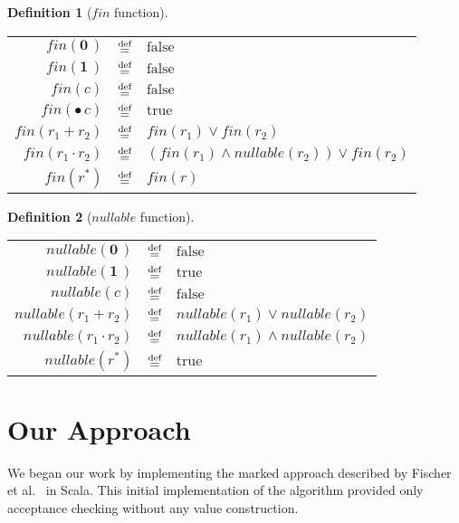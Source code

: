 \documentclass[12pt]{article}
\newtheorem{definition}{Definition} %
\newcommand{\dn}{\ensuremath{\stackrel{\mbox{\scriptsize def}}{=}}}
\newcommand{\ZERO}{\textbf{0}}
\newcommand{\ONE}{\textbf{1}}
\newcommand{\Marked}[1]{\bullet\,#1}
\newcommand{\fin}{\textit{fin}}
\newcommand{\nullable}{\textit{nullable}}
\begin{document}
\begin{definition}[$\fin$ function]\mbox{}
\begin{center}{
  \renewcommand{\arraystretch}{1.7}
  \begin{tabular}{rcl}
    $\fin(\ZERO\,)$            & \dn & $\text{false}$ \\
    $\fin(\ONE\,)$             & \dn & $\text{false}$ \\
    $\fin(c)$                  & \dn & $\text{false}$ \\
    $\fin(\Marked{c})$         & \dn & $\text{true}$ \\
    $\fin(r_1 + r_2)$          & \dn & $\fin(r_1) \lor \fin(r_2)$ \\ 
    $\fin(r_1 \cdot r_2)$      & \dn & $(\fin(r_1) \land \nullable(r_2)) \lor \fin(r_2)$ \\
    $\fin(r^*)$                & \dn & $\fin(r)$  
  \end{tabular}
  \renewcommand{\arraystretch}{1.0}
}
\end{center}
\end{definition}

\begin{definition}[$\nullable$ function]\mbox{}
\begin{center}{
  \renewcommand{\arraystretch}{1.7}
  \begin{tabular}{rcl}
    $\nullable(\ZERO\,)$         & \dn & $\text{false}$ \\
    $\nullable(\ONE\,)$          & \dn & $\text{true}$ \\
    $\nullable(c)$               & \dn & $\text{false}$ \\
    $\nullable(r_1 + r_2)$       & \dn & $\nullable(r_1) \lor \nullable(r_2)$ \\ 
    $\nullable(r_1 \cdot r_2)$   & \dn & $\nullable(r_1) \land \nullable(r_2)$ \\
    $\nullable(r^*)$             & \dn & $\text{true}$
  \end{tabular}
  \renewcommand{\arraystretch}{1.0}
}
\end{center}
\end{definition}


\section{Our Approach}
We began our work by implementing the marked approach described by Fischer et al.~\cite{Fischer2010} in Scala. 
This initial implementation of the algorithm provided only acceptance checking without any value construction.  
\end{document}
